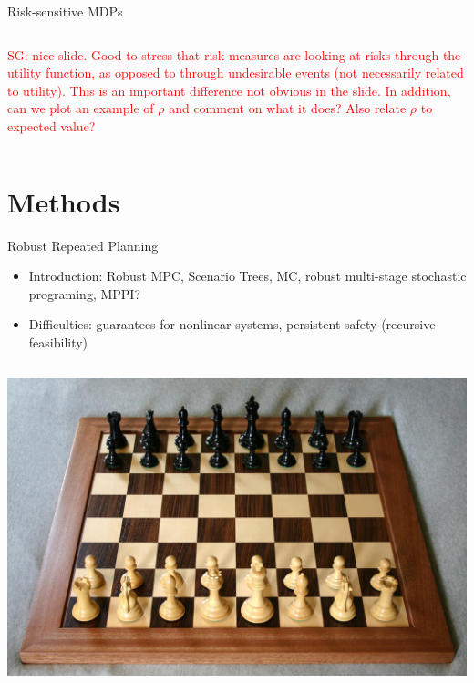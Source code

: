 \documentclass[lecture]{beamer}
\begin{document}
\begin{frame}{\normalsize Risk-sensitive MDPs}
\begin{columns}[t]
\textcolor{red}{SG: nice slide. Good to stress that risk-measures are looking at risks through the utility function, as opposed to through undesirable events (not necessarily related to utility). This is an important difference not obvious in the slide. In addition, can we plot an example of $\rho$ and comment on what it does? Also relate $\rho$ to expected value?}
\end{columns}

\end{frame}

\section{Methods}

\begin{frame}{\normalsize Robust Repeated Planning}
\footnotesize
\begin{itemize}
\item Introduction: Robust MPC, Scenario Trees, MC, robust multi-stage stochastic programing, MPPI?
\item Difficulties: guarantees for nonlinear systems, persistent safety (recursive feasibility)
\end{itemize}

\begin{columns}[t]


\includegraphics[width=1\textwidth,clip]{Figures/Chess.pdf}
\end{columns}

\end{frame}
\end{document}
